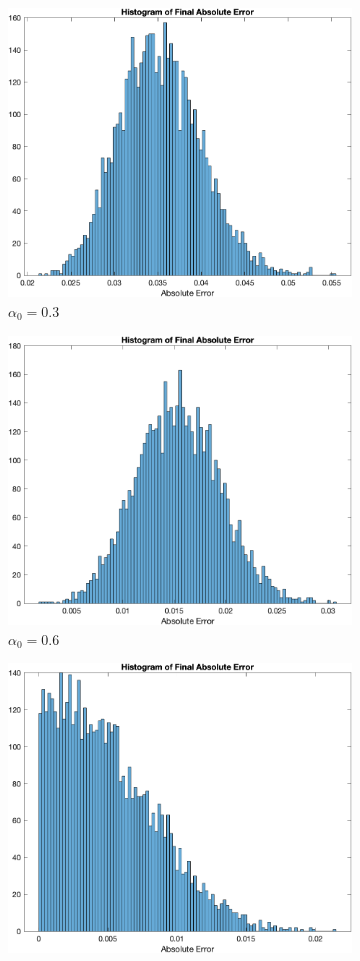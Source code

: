 \documentclass{article}
\begin{document}
\begin{figure}[htp]
	
	\begin{subfigure}{.5\textwidth}
		\centering
		\includegraphics[width=0.8\linewidth]{figs/Q3/Histogram/M1000_a03.png}
		\caption{$ \alpha_0 = 0.3 $}
	\end{subfigure}
	\begin{subfigure}{.5\textwidth}
		\centering
		\includegraphics[width=0.8\linewidth]{figs/Q3/Histogram/M1000_a06.png}
		\caption{$ \alpha_0 = 0.6 $}
	\end{subfigure}
	\begin{subfigure}{.5\textwidth}
		\centering
		\includegraphics[width=0.8\linewidth]{figs/Q3/Histogram/M1000_a08.png}

\end{subfigure}
\end{figure}
\end{document}
